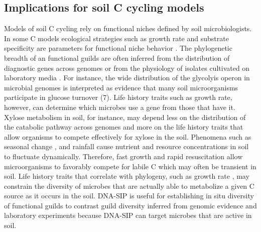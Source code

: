 \subsection{Implications for soil C cycling models}
Models of soil C cycling rely on functional niches defined by soil
microbiologists. In some C models ecological strategies such as growth rate and
substrate specificity are parameters for functional niche behavior
\citep{Kaiser2014a}. The phylogenetic breadth of an functional guilds are
often inferred from the distribution of diagnostic genes across genomes
\citep{Berlemont2013} or from the physiology of isolates cultivated on
laboratory media \citep{Martiny2013}. For instance, the wide
distribution of the glycolyis operon in microbial genomes is interpreted
as evidence that many soil microorganisms participate in glucose turnover
(7). Life history traits such as growth rate, however, can determine which
microbes use a gene from those that have it. Xylose metabolism in soil,
for instance, may depend less on the distribution of the catabolic pathway
across genomes and more on the life history traits that allow organisms to
compete effectively for xylose in the soil. Phenomena such as seasonal
change \citep{Schmidt2007}, and rainfall \citep{Evans2014a} cause nutrient and
resource concentrations in soil to fluctuate dynamically. Therefore, fast
growth and rapid resuscitation allow microorganisms to favorably compete
for labile C which may often be transient in soil. Life history traits
that correlate with phylogeny, such as growth rate \citep{Fierer2007}, may
constrain the diversity of microbes that are actually able to metabolize
a given C source as it occurs in the soil. DNA-SIP is useful for
establishing in situ diversity of functional guilds to contrast guild
diversity inferred from genomic evidence and laboratory experiments
because DNA-SIP can target microbes that are active in soil. 

